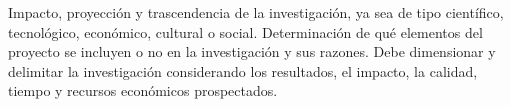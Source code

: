 Impacto, proyección y trascendencia de la investigación, ya sea de tipo científico, tecnológico, económico, cultural o social. Determinación de qué elementos del proyecto se incluyen o no en la investigación y sus razones. Debe dimensionar y delimitar la investigación considerando los resultados, el impacto, la calidad, tiempo y recursos económicos prospectados.
